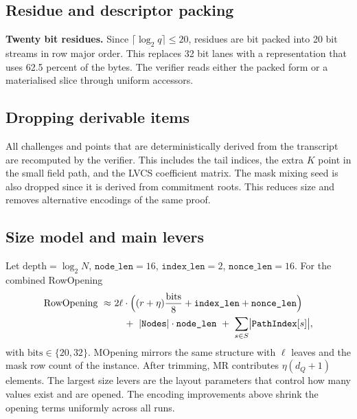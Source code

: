 \subsection*{Residue and descriptor packing}
\textbf{Twenty bit residues.} Since \(\lceil \log_2 q\rceil \le 20\), residues are bit packed into 20 bit streams in row major order. This replaces 32 bit lanes with a representation that uses 62.5 percent of the bytes. The verifier reads either the packed form or a materialised slice through uniform accessors.


\subsection*{Dropping derivable items}
All challenges and points that are deterministically derived from the transcript are recomputed by the verifier. This includes the tail indices, the extra \(K\) point in the small field path, and the LVCS coefficient matrix. The mask mixing seed is also dropped since it is derived from commitment roots. This reduces size and removes alternative encodings of the same proof.

\subsection*{Size model and main levers}
Let \(\text{depth}=\log_2 N\), \(\texttt{node\_len}=16\), \(\texttt{index\_len}=2\), \(\texttt{nonce\_len}=16\). For the combined RowOpening
\[
\begin{aligned}
\text{RowOpening}\ \approx\ &
  2\ell\cdot\Bigl((r+\eta)\frac{\text{bits}}{8}+\texttt{index\_len}+\texttt{nonce\_len}\Bigr) \\
 &\quad +\ |\texttt{Nodes}|\cdot \texttt{node\_len}
 \ +\ \sum_{s\in S}\bigl|\texttt{PathIndex}[s]\bigr|,
\end{aligned}
\]
with \(\text{bits}\in\{20,32\}\). MOpening mirrors the same structure with \(\ell\) leaves and the mask row count of the instance. After trimming, MR contributes \(\eta(d_Q{+}1)\) elements. The largest size levers are the layout parameters that control how many values exist and are opened. The encoding improvements above shrink the opening terms uniformly across all runs.

